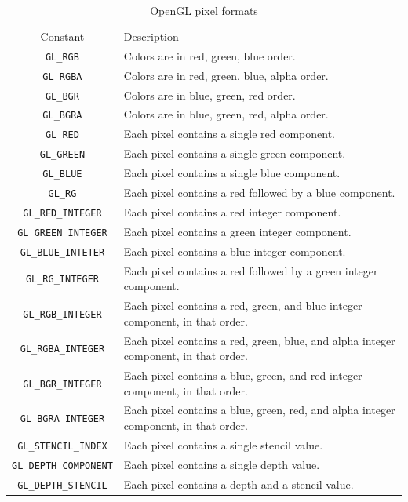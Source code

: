 \begin{table}[hbt]
  \begin{center}
    \caption{OpenGL pixel formats}
    \begin{tabular}{cp{9cm}} 
      \hline
      Constant & Description \\
      \verb!GL_RGB! & Colors are in red, green, blue order. \\
      \verb!GL_RGBA! & Colors are in red, green, blue, alpha order.\\
      \verb!GL_BGR!& Colors are in blue, green, red order.\\
      \verb!GL_BGRA!& Colors are in blue, green, red, alpha order.\\
      \verb!GL_RED!& Each pixel contains a single red component.\\
      \verb!GL_GREEN!& Each pixel contains a single green component.\\
      \verb!GL_BLUE!& Each pixel contains a single blue component.\\
      \verb!GL_RG!& Each pixel contains a red followed by a blue component.\\
      \verb!GL_RED_INTEGER!& Each pixel contains a red integer component.\\
      \verb!GL_GREEN_INTEGER!& Each pixel contains a green integer component.\\
      \verb!GL_BLUE_INTETER!& Each pixel contains a blue integer component.\\
      \verb!GL_RG_INTEGER!& Each pixel contains a red followed by a green integer component.\\
      \verb!GL_RGB_INTEGER!& Each pixel contains a red, green, and blue integer component, in
      that order.\\
      \verb!GL_RGBA_INTEGER! & Each pixel contains a red, green, blue, and alpha integer component,
      in that order.\\
      \verb!GL_BGR_INTEGER!& Each pixel contains a blue, green, and red integer component, in
      that order.\\
      \verb!GL_BGRA_INTEGER!& Each pixel contains a blue, green, red, and alpha integer component,
      in that order.\\
      \verb!GL_STENCIL_INDEX!& Each pixel contains a single stencil value.\\
      \verb!GL_DEPTH_COMPONENT!& Each pixel contains a single depth value.\\
      \verb!GL_DEPTH_STENCIL!& Each pixel contains a depth and a stencil value.\\
      \hline\hline
    \end{tabular}
  \end{center}
  \label{tab:OpenGL_color}
\end{table}


